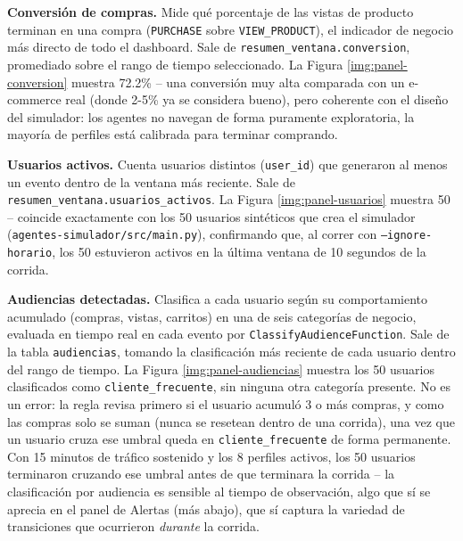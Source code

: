
\textbf{Conversión de compras.} Mide qué porcentaje de las vistas de producto terminan en una compra (\texttt{PURCHASE} sobre \texttt{VIEW\_PRODUCT}), el indicador de negocio más directo de todo el dashboard. Sale de \texttt{resumen\_ventana.conversion}, promediado sobre el rango de tiempo seleccionado. La Figura \ref{img:panel-conversion} muestra 72.2\% -- una conversión muy alta comparada con un e-commerce real (donde 2-5\% ya se considera bueno), pero coherente con el diseño del simulador: los agentes no navegan de forma puramente exploratoria, la mayoría de perfiles está calibrada para terminar comprando.


\textbf{Usuarios activos.} Cuenta usuarios distintos (\texttt{user\_id}) que generaron al menos un evento dentro de la ventana más reciente. Sale de \texttt{resumen\_ventana.usuarios\_activos}. La Figura \ref{img:panel-usuarios} muestra 50 -- coincide exactamente con los 50 usuarios sintéticos que crea el simulador (\texttt{agentes-simulador/src/main.py}), confirmando que, al correr con \texttt{--ignore-horario}, los 50 estuvieron activos en la última ventana de 10 segundos de la corrida.


\textbf{Audiencias detectadas.} Clasifica a cada usuario según su comportamiento acumulado (compras, vistas, carritos) en una de seis categorías de negocio, evaluada en tiempo real en cada evento por \texttt{ClassifyAudienceFunction}. Sale de la tabla \texttt{audiencias}, tomando la clasificación más reciente de cada usuario dentro del rango de tiempo. La Figura \ref{img:panel-audiencias} muestra los 50 usuarios clasificados como \texttt{cliente\_frecuente}, sin ninguna otra categoría presente. No es un error: la regla revisa primero si el usuario acumuló 3 o más compras, y como las compras solo se suman (nunca se resetean dentro de una corrida), una vez que un usuario cruza ese umbral queda en \texttt{cliente\_frecuente} de forma permanente. Con 15 minutos de tráfico sostenido y los 8 perfiles activos, los 50 usuarios terminaron cruzando ese umbral antes de que terminara la corrida -- la clasificación por audiencia es sensible al tiempo de observación, algo que sí se aprecia en el panel de Alertas (más abajo), que sí captura la variedad de transiciones que ocurrieron \textit{durante} la corrida.

